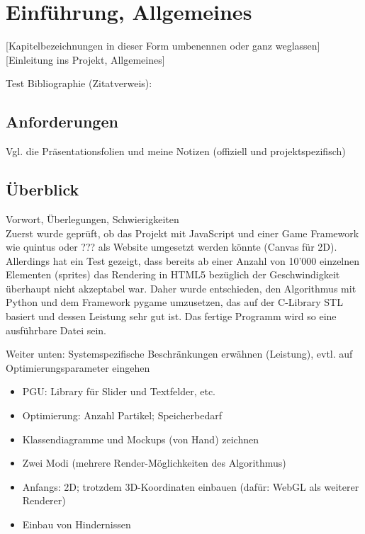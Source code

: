 
\chapter{Einführung, Allgemeines}

[Kapitelbezeichnungen in dieser Form umbenennen oder ganz weglassen] \\

[Einleitung ins Projekt, Allgemeines]

\vspace*{1cm}

\hspace*{3cm} Test Bibliographie (Zitatverweis): \cite[S. 115]{ds-ant}


\section{Anforderungen}

Vgl. die Präsentationsfolien und meine Notizen (offiziell und projektspezifisch) \\


\vspace*{1cm}


\section{Überblick}

Vorwort, Überlegungen, Schwierigkeiten \\

Zuerst wurde geprüft, ob das Projekt mit JavaScript und einer Game Framework wie quintus oder ??? als Website umgesetzt werden könnte (Canvas für 2D). Allerdings hat ein Test gezeigt, dass bereits ab einer Anzahl von 10'000 einzelnen Elementen (sprites) das Rendering in HTML5 bezüglich der Geschwindigkeit überhaupt nicht akzeptabel war. Daher wurde entschieden, den Algorithmus mit Python und dem Framework pygame umzusetzen, das auf der C-Library STL basiert und dessen Leistung sehr gut ist. Das fertige Programm wird so eine ausführbare Datei sein.

\vspace*{1cm}

Weiter unten: Systemspezifische Beschränkungen erwähnen (Leistung), evtl. auf Optimierungsparameter eingehen

\vspace*{1cm} 

\begin{itemize}[noitemsep]
\item PGU: Library für Slider und Textfelder, etc.
\item Optimierung: Anzahl Partikel; Speicherbedarf
\item Klassendiagramme und Mockups (von Hand) zeichnen
\item Zwei Modi (mehrere Render-Möglichkeiten des Algorithmus)
\item Anfangs: 2D; trotzdem 3D-Koordinaten einbauen (dafür: WebGL als weiterer Renderer)
\item Einbau von Hindernissen
\end{itemize}


